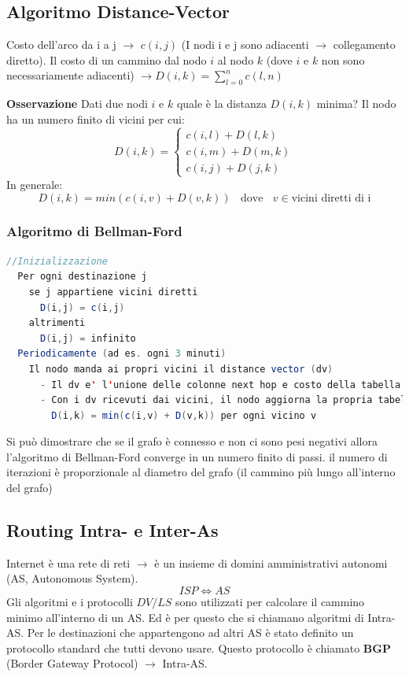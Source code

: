\documentclass[a4paper]{article}
\begin{document}
\subsection{Algoritmo Distance-Vector}

Costo dell'arco da i a j $\rightarrow$ $c(i,j)$ (I nodi i e j sono adiacenti $\rightarrow$ collegamento diretto).
Il costo di un cammino dal nodo $i$ al nodo $k$ (dove $i$ e $k$ non sono necessariamente adiacenti) 
$\rightarrow D(i,k) = \sum_{l = 0}^{n} c(l,n)$ 

\vspace{1em}
\noindent
\textbf{Osservazione}
Dati due nodi $i$ e $k$ quale è la distanza $D(i, k)$ minima?
Il nodo ha un numero finito di vicini per cui:
\[D(i,k) = \begin{cases}
  c(i,l) + D(l,k)\\
  c(i,m) + D(m,k)\\
  c(i,j) + D(j,k)
\end{cases}\]
In generale:
\[D(i,k) = min(c(i,v) + D(v,k)) \; \; \text{ dove } \; \; v \in \text{vicini diretti di i}\]
\subsubsection{Algoritmo di Bellman-Ford}
\begin{lstlisting}[language=Scala]
  //Inizializzazione
  Per ogni destinazione j
    se j appartiene vicini diretti 
      D(i,j) = c(i,j)
    altrimenti
      D(i,j) = infinito
  Periodicamente (ad es. ogni 3 minuti)
    Il nodo manda ai propri vicini il distance vector (dv)
      - Il dv e' l'unione delle colonne next hop e costo della tabella di routing del nodo
      - Con i dv ricevuti dai vicini, il nodo aggiorna la propria tabella di routing per ogni destinaizone
        D(i,k) = min(c(i,v) + D(v,k)) per ogni vicino v
\end{lstlisting}
\noindent
Si può dimostrare che se il grafo è connesso e non ci sono pesi negativi allora l'algoritmo di Bellman-Ford converge in un numero finito di passi.
il numero di iterazioni è proporzionale al diametro del grafo (il cammino più lungo all'interno del grafo)

\subsection{Routing Intra- e Inter-As}
Internet è una rete di reti $\rightarrow$ è un insieme di domini amministrativi autonomi (AS, Autonomous System). 
\[ISP \Longleftrightarrow AS \]
Gli algoritmi e i protocolli $DV/LS$ sono utilizzati per calcolare il cammino minimo all'interno di un AS. Ed è per questo che si chiamano algoritmi di Intra-AS.
Per le destinazioni che appartengono ad altri AS è stato definito un protocollo standard che tutti devono usare. Questo protocollo è chiamato \textbf{BGP} (Border Gateway Protocol) $\rightarrow$ Intra-AS.
\end{document}
